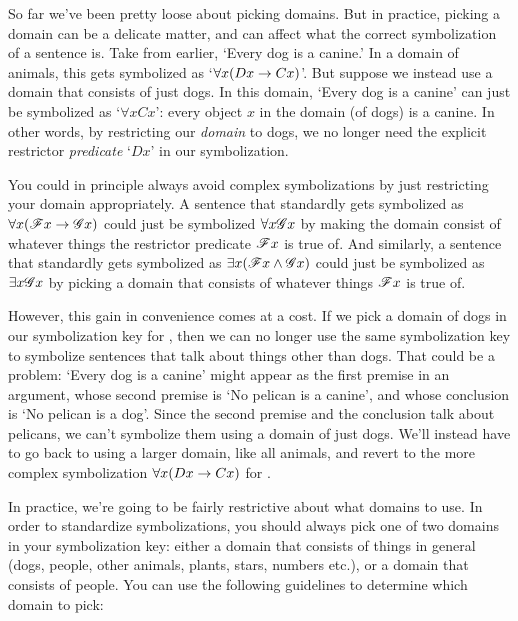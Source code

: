 So far we've been pretty loose about picking domains.  But in practice, picking a domain can be a delicate matter, and can affect what the correct symbolization of a sentence is.  Take  from earlier, `Every dog is a canine.'  In a domain of animals, this gets symbolized as `$\forall x (Dx \rightarrow Cx)$'.  But suppose we instead use a domain that consists of just dogs.  In this domain, `Every dog is a canine' can just be symbolized as `$\forall xCx$': every object $x$ in the domain (of dogs) is a canine.  In other words, by restricting our \emph{domain} to dogs, we no longer need the explicit restrictor \emph{predicate} `$Dx$' in our symbolization.


You could in principle always avoid complex symbolizations by just restricting your domain appropriately.  A sentence that standardly gets symbolized as $\forall x (\mathscr{F}x \rightarrow \mathscr{G}x)$ could just be symbolized $\forall x \mathscr{G}x$ by making the domain consist of whatever things the restrictor predicate $\mathscr{F}x$ is true of.  And similarly, a sentence that standardly gets symbolized as $\exists x (\mathscr{F}x \wedge \mathscr{G}x)$ could just be symbolized as $\exists x \mathscr{G}x$ by picking a domain that consists of whatever things $\mathscr{F}x$ is true of.

However, this gain in convenience comes at a cost.  If we pick a domain of dogs in our symbolization key for , then we can no longer use the same symbolization key to symbolize sentences that talk about things other than dogs.  That could be a problem: `Every dog is a canine' might appear as the first premise in an argument, whose second premise is `No pelican is a canine', and whose conclusion is `No pelican is a dog'.  Since the second premise and the conclusion talk about pelicans, we can't symbolize them using a domain of just dogs.  We'll instead have to go back to using a larger domain, like all animals, and revert to the more complex symbolization  $\forall x (Dx \rightarrow Cx)$ for .

In practice, we're going to be fairly restrictive about what domains to use.  In order to standardize symbolizations, you should always pick one of two domains in your symbolization key: either a domain that consists of things in general (dogs, people, other animals, plants, stars, numbers etc.), or a domain that consists of people.  You can use the following guidelines to determine which domain to pick:

